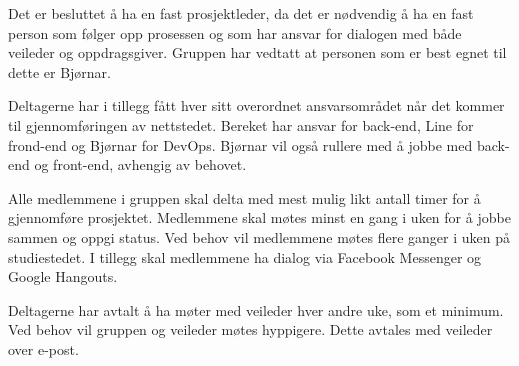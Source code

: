 \documentclass[11pt,a4paper]{report}
\begin{document}
Det er besluttet å ha en fast prosjektleder, da det er nødvendig å ha en fast person som følger opp prosessen og som har ansvar for dialogen med både veileder og oppdragsgiver. Gruppen har vedtatt at personen som er best egnet til dette er Bjørnar.

Deltagerne har i tillegg fått hver sitt overordnet ansvarsområdet når det kommer til gjennomføringen av nettstedet. Bereket har ansvar for back-end, Line for frond-end og Bjørnar for DevOps. Bjørnar vil også rullere med å jobbe med back-end og front-end, avhengig av behovet.

Alle medlemmene i gruppen skal delta med mest mulig likt antall timer for å gjennomføre prosjektet. Medlemmene skal møtes minst en  gang i uken for å jobbe sammen og oppgi status. Ved behov vil medlemmene møtes flere ganger i uken på studiestedet. I tillegg skal medlemmene ha dialog via Facebook Messenger og Google Hangouts.

Deltagerne har avtalt å ha møter med veileder hver andre uke, som et minimum. Ved behov vil gruppen og veileder møtes hyppigere. Dette avtales med veileder over e-post.
\end{document}
